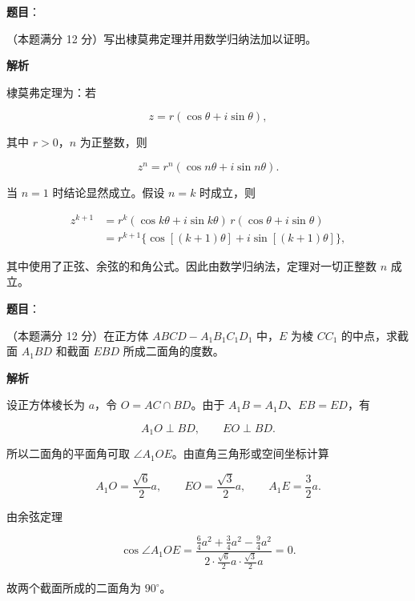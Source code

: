 \begin{answer}

\textbf{题目}：

（本题满分 12 分）写出棣莫弗定理并用数学归纳法加以证明。

\textbf{解析}

棣莫弗定理为：若

\nopagebreak[4]
\[
z=r(\cos\theta+i\sin\theta),
\]

其中 $r>0$，$n$ 为正整数，则

\nopagebreak[4]
\[
z^n=r^n(\cos n\theta+i\sin n\theta).
\]

当 $n=1$ 时结论显然成立。假设 $n=k$ 时成立，则

\nopagebreak[4]
\[
\begin{aligned}
z^{k+1}
&=r^k(\cos k\theta+i\sin k\theta)\,
r(\cos\theta+i\sin\theta)\\
&=r^{k+1}\{\cos[(k+1)\theta]
+i\sin[(k+1)\theta]\},
\end{aligned}
\]

其中使用了正弦、余弦的和角公式。因此由数学归纳法，定理对一切正整数 $n$ 成立。


\end{answer}
\begin{answer}

\textbf{题目}：

（本题满分 12 分）在正方体
$ABCD-A_1B_1C_1D_1$ 中，$E$ 为棱 $CC_1$ 的中点，求截面 $A_1BD$ 和截面 $EBD$ 所成二面角的度数。
\nopagebreak[4]
\begin{center}\end{center}
\nopagebreak[4]
\textbf{解析}

设正方体棱长为 $a$，令 $O=AC\cap BD$。由于 $A_1B=A_1D$、$EB=ED$，有

\nopagebreak[4]
\[
A_1O\perp BD,\qquad EO\perp BD.
\]

所以二面角的平面角可取 $\angle A_1OE$。由直角三角形或空间坐标计算

\nopagebreak[4]
\[
A_1O=\frac{\sqrt6}{2}a,\qquad
EO=\frac{\sqrt3}{2}a,\qquad
A_1E=\frac32a.
\]

由余弦定理

\nopagebreak[4]
\[
\cos\angle A_1OE
=\frac{\frac64a^2+\frac34a^2-\frac94a^2}
{2\cdot\frac{\sqrt6}{2}a\cdot\frac{\sqrt3}{2}a}=0.
\]

故两个截面所成的二面角为 $90^\circ$。


\end{answer}

